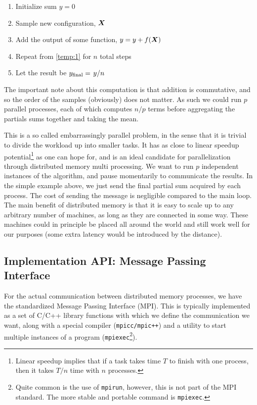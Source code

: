 \documentclass[Thesis.tex]{subfiles}
\begin{document}
\begin{enumerate}
\item Initialize sum $y = 0$
\item Sample new configuration, $\bm{X}$\label{temp:1}
\item Add the output of some function, $y = y + f(\bm{X})$
\item Repeat from \ref{temp:1} for $n$ total steps
\item Let the result be $y_\text{final} = \flatfrac{y}{n}$
\end{enumerate}
The important note about this computation is that addition is commutative, and
so the order of the samples (obviously) does not matter. As such we could run
$p$ parallel processes, each of which computes $n / p$ terms before aggregating
the partials sums together and taking the mean.

This is a so called embarrassingly parallel problem, in the sense that it is
trivial to divide the workload up into smaller tasks. It has as close to linear
speedup potential\footnote{Linear speedup implies that if a task takes time $T$
to finish with one process, then it takes $T/n$ time with $n$ processes.} as one
can hope for, and is an ideal candidate for parallelization through distributed
memory multi processing. We want to run $p$ independent instances of the
algorithm, and pause momentarily to communicate the results. In the simple
example above, we just send the final partial sum acquired by each process. The
cost of sending the message is negligible compared to the main loop.
The main benefit of distributed memory is that it is easy to scale up to any
arbitrary number of machines, as long as they are connected in some way. These
machines could in principle be placed all around the world and still work well
for our purposes (some extra latency would be introduced by the distance).

\subsection{Implementation API: Message Passing Interface}

For the actual communication between distributed memory processes, we have the
standardized Message Passing Interface (MPI). This is typically implemented as a
set of C/C++ library functions with which we define the communication we want,
along with a special compiler (\texttt{mpicc/mpic++}) and a utility to start
multiple instances of a program (\texttt{mpiexec}\footnote{Quite common is the
  use of \texttt{mpirun}, however, this is not part of the MPI standard. The
  more stable and portable command is \texttt{mpiexec}.}).
\end{document}
